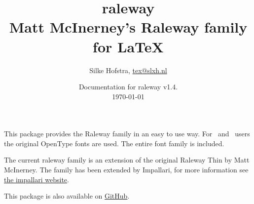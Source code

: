 \documentclass[10pt,a4paper,english]{article}
\title{\bfseries
	\Huge raleway\\
	\Large Matt McInerney’s Raleway family for \LaTeX
}
\author{Silke Hofstra, \href{mailto:tex@slxh.nl}{tex@slxh.nl}}
\date{Documentation for raleway v1.4.\\ \today}
\begin{document}
\maketitle
\begin{multicols}{2}
This package provides the Raleway family in an easy to use way. For \XeLaTeX\ and \LuaLaTeX\ users the original OpenType fonts are used. The entire font family is included.

The current raleway family is an extension of the original Raleway Thin by Matt McInerney. The family has been extended by Impallari, for more information see \href{http://www.impallari.com/projects/overview/matt-mcinerneys-raleway-family}{the impallari website}.

This package is also available on \href{https://github.com/silkeh/latex-raleway}{GitHub}.


\end{multicols}
\end{document}
